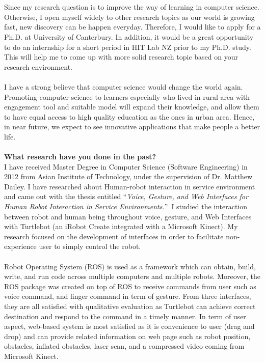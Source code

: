 \documentclass[11pt,a4paper,roman]{moderncv}        %
\begin{document}
\\
\\
Since my research question is to improve the way of learning in computer science. Otherwise, I open myself widely to other research topics as our world is growing fast, new discovery can be happen everyday. Therefore, I would like to apply for a Ph.D. at University of Canterbury. In addition, it would be a great opportunity to do an internship for a short period in HIT Lab NZ prior to my Ph.D. study. This will help me to come up with more solid research topic based on your research environment.
\\
\\
I have a strong believe that computer science would change the world again. Promoting computer science to learners especially who lived in rural area  with engagement tool and suitable model will expand their knowledge, and allow them to have equal access to high quality education as the ones in urban area. Hence, in near future, we expect to see innovative applications that make people a better life. 
\\
\\
\textbf{What research have you done in the past?}
\\
I have received Master Degree in Computer Science (Software Engineering) in 2012 from Asian Institute of Technology, under the supervision of Dr. Matthew Dailey. I have researched about Human-robot interaction in service environment and came out with the thesis entitled ``\emph{Voice, Gesture, and Web Interfaces for Human Robot Interaction in Service Environments.}''\ I studied the interaction between robot and human being throughout voice, gesture, and Web Interfaces with Turtlebot (an iRobot Create integrated with a Microsoft Kinect). My research focused on the development of interfaces in order to facilitate non-experience user to simply control the robot. 
\\
\\
Robot Operating System (ROS) is used as a framework which can obtain, build, write, and run code across multiple computers and multiple robots. Moreover, the ROS package was created on top of ROS to receive commands from user such as voice command, and finger command in term of gesture. From three interfaces, they are all satisfied with qualitative evaluation as Turtlebot can achieve correct destination and respond to the command in a timely manner. In term of user aspect, web-based system is most satisfied as it is convenience to user (drag and drop) and can provide related information on web page such as robot position, obstacles, inflated obstacles, laser scan, and a compressed video coming from Microsoft Kinect.
\end{document}
